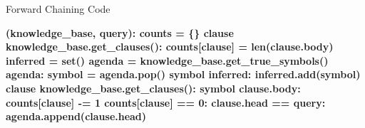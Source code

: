 \documentclass[14pt]{beamer}
\begin{document}
\begin{frame}[fragile]{Forward Chaining Code}
	\begin{semiverbatim}\bfseries\scriptsize
		 (knowledge_base, query):
		    \pause{}
		    counts = \{\}
		     clause  knowledge_base.get_clauses():
		        counts[clause] = len(clause.body)
		    \pause{}
		    inferred = set()
		    agenda = knowledge_base.get_true_symbols()
		     agenda:
		        symbol = agenda.pop()
		         symbol  inferred:
		            inferred.add(symbol)
		            \pause{}
		             clause  knowledge_base.get_clauses():
		                 symbol  clause.body:
		                    counts[clause] -= 1
		                    \pause{} counts[clause] == 0:
		                         clause.head == query:
		                             
		                        agenda.append(clause.head)
		     
	\end{semiverbatim}
\end{frame}
\end{document}
